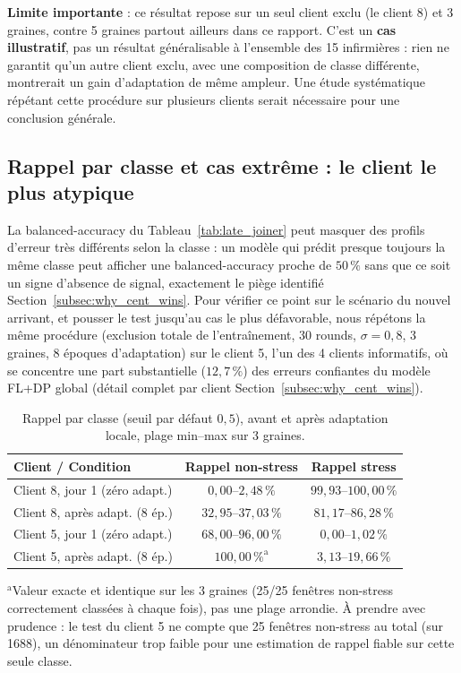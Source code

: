 \documentclass{article}
\begin{document}
\textbf{Limite importante} : ce résultat repose sur un seul client exclu (le client 8)
et 3 graines, contre 5 graines partout ailleurs dans ce rapport. C'est un
\textbf{cas illustratif}, pas un résultat généralisable à l'ensemble des 15
infirmières : rien ne garantit qu'un
autre client exclu, avec une composition de classe différente, montrerait un gain
d'adaptation de même ampleur. Une étude systématique répétant cette procédure sur
plusieurs clients serait nécessaire pour une conclusion générale.

\subsection{Rappel par classe et cas extrême : le client le plus atypique}
\label{subsec:late_joiner_recall}

La balanced-accuracy du Tableau~\ref{tab:late_joiner} peut masquer des profils
d'erreur très différents selon la classe : un modèle qui prédit presque toujours la
même classe peut afficher une balanced-accuracy proche de $50\,\%$ sans que ce soit un
signe d'absence de signal, exactement le piège identifié
Section~\ref{subsec:why_cent_wins}. Pour vérifier ce point sur le scénario du nouvel
arrivant, et pousser le test jusqu'au cas le plus défavorable, nous répétons la même
procédure (exclusion totale de l'entraînement, 30 rounds, $\sigma=0{,}8$, 3 graines,
8 époques d'adaptation) sur le client 5, l'un des 4 clients informatifs, où se
concentre une part substantielle ($12{,}7\,\%$) des erreurs confiantes du modèle
FL+DP global (détail complet par client Section~\ref{subsec:why_cent_wins}).

\begin{table}[h!]
  \centering
  \caption{Rappel par classe (seuil par défaut $0{,}5$), avant et après adaptation
  locale, plage min--max sur 3 graines.}
  \label{tab:late_joiner_recall}
  \begin{tabular}{lcc}
    \toprule
    Client / Condition & Rappel non-stress & Rappel stress \\
    \midrule
    Client 8, jour 1 (zéro adapt.)      & $0{,}00$--$2{,}48\,\%$   & $99{,}93$--$100{,}00\,\%$ \\
    Client 8, après adapt. (8 ép.)      & $32{,}95$--$37{,}03\,\%$ & $81{,}17$--$86{,}28\,\%$ \\
    \addlinespace
    Client 5, jour 1 (zéro adapt.)      & $68{,}00$--$96{,}00\,\%$ & $0{,}00$--$1{,}02\,\%$ \\
    Client 5, après adapt. (8 ép.)      & $100{,}00\,\%^{\text{a}}$ & $3{,}13$--$19{,}66\,\%$ \\
    \bottomrule
  \end{tabular}
  \vspace{2pt}
  {\footnotesize $^{\text{a}}$Valeur exacte et identique sur les 3 graines (25/25
  fenêtres non-stress correctement classées à chaque fois), pas une plage arrondie.
  À prendre avec prudence : le test du client 5 ne compte que 25 fenêtres non-stress
  au total (sur 1688), un dénominateur trop faible pour une estimation de rappel
  fiable sur cette seule classe.}
\end{table}
\end{document}
